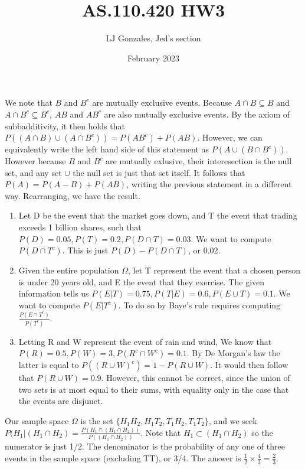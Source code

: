 \documentclass{article}
\title{AS.110.420 HW3}
\author{LJ Gonzales, Jed's section}
\date{February 2023}
\begin{document}
\maketitle

\begin{prob}
	We note that $B$ and $B^c$ are mutually exclusive events. Because $A \cap B \subseteq B$ and  $A \cap B^c \subseteq B^c$, $AB$ and $AB^c$ are also mutually exclusive events. By the axiom of subbadditivity, it then holds that $P((A \cap B) \cup (A \cap B^c)) = P(AB^c)+P(AB)$. However, we can equivalently write the left hand side of this statement as $P(A \cup (B \cap B^c))$. However because $B$ and $B^c$ are mutually exlusive, their interesection is the null set, and any set $\cup$ the null set is just that set itself. It follows that $P(A)=P(A-B)+P(AB)$, writing the previous statement in a different way. Rearranging, we have the result. 
\end{prob}

\begin{prob}
\begin{enumerate}
	\item Let D be the event that the market goes down, and T the event that trading exceeds 1 billion shares, such that $P(D)=0.05, P(T)=0.2, P(D \cap T)=0.03$.
		We want to compute $P(D \cap T^c)$. This is just $P(D)-P(D \cap T)$, or 0.02.

	\item Given the entire population $\Omega$, let T represent the event that a chosen person is under 20 years old, and E the event that they exercise.
		The given information tells us $P(E|T)=0.75, P(T|E)=0.6, P(E \cup T)=0.1$. We want to compute  $P(E|T^c)$.
		To do so by Baye's rule requires computing $\frac{P(E \cap T^c)}{P(T^c)}$.

	\item Letting R and W represent the event of rain and wind, We know that $P(R)=0.5, P(W)=3, P(R^c \cap W^c)=0.1$. 
		By De Morgan's law the latter is equal to $P((R \cup W)^c)=1-P(R \cup W)$. It would then follow that $P(R \cup W)=0.9$.
		However, this cannot be correct, since the union of two sets is at most equal to their sums, with equality only in the case that the events are disjunct.
\end{enumerate}	
\end{prob}

\begin{prob}
	Our sample space $\Omega$ is the set  $\{H_1H_2, H_1T_2, T_1H_2, T_1T_2\}$, and we seek $P(H_1|(H_1 \cap H_2)=\frac{P(H_1 \cap (H_1 \cap H_2))}{P((H_1 \cap H_2))}$.
	Note that $H_1 \subset (H_1 \cap H_2)$ so the numerator is just 1/2. The denominator is the probability of any one of three events in the sample space (excluding TT), or 3/4. The answer is $\frac{1}{2}\times\frac{4}{3}=\frac{2}{3}$.
\end{prob}
\end{document}
